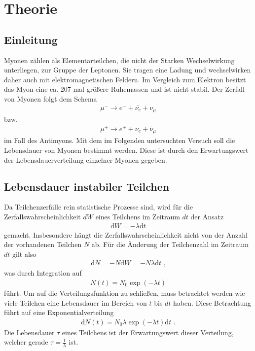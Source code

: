 \section{Theorie}
\label{sec:Theorie}

\subsection{Einleitung}
\label{subsec:Einleitung}
Myonen zählen als Elementarteilchen, die nicht der Starken Wechselwirkung unterliegen, zur Gruppe der Leptonen.
Sie tragen eine Ladung und wechselwirken daher auch mit elektromagnetischen Feldern.
Im Vergleich zum Elektron besitzt das Myon eine ca. 207 mal größere Ruhemassen und ist nicht stabil.
Der Zerfall von Myonen folgt dem Schema
\begin{align}
\mu^- \longrightarrow e^- + \bar{\nu_e} + \nu_\mu
\end{align}
bzw.
\begin{align}
\mu^+ \longrightarrow e^+ + \nu_e + \bar{\nu}_\mu
\end{align}
im Fall des Antimyons.
Mit dem im Folgenden untersuchten Versuch soll die Lebensdauer von Myonen bestimmt werden.
Diese ist durch den Erwartungswert der Lebensdauerverteilung einzelner Myonen gegeben.
\subsection{Lebensdauer instabiler Teilchen}
\label{subsec:Lebensdauer instabiler Teilchen}
Da Teilchenzerfälle rein statistische Prozesse sind, wird für die Zerfallswahrscheinlichkeit $dW$ eines Teilchens im Zeitraum $dt$ der Ansatz
\begin{align}
\text{d} W = -  \lambda \text{d} t
\end{align} 
gemacht.
Insbesondere hängt die Zerfallswahrscheinlichkeit nicht von der Anzahl der vorhandenen Teilchen $N$ ab.
Für die Änderung der Teilchenzahl im Zeitraum $dt$ gilt also
\begin{align}
\text{d} N = - N \text{d} W = - N \lambda \text{d} t\text{ ,}
\end{align} 
was durch Integration auf 
\begin{align}
N(t)=N_0\exp(-\lambda t)
\end{align}
führt.
Um auf die Verteilungsfunktion zu schließen, muss betrachtet werden wie viele Teilchen eine Lebensdauer im Bereich von $t$ bis $dt$ haben.
Diese Betrachtung führt auf eine Exponentialverteilung
\begin{align}
\text{d} N(t)=N_0 \lambda \exp(-\lambda t) \text{d} t \text{ .}
\end{align}
Die Lebensdauer $\tau$ eines Teilchens ist der Erwartungswert dieser Verteilung, welcher gerade $\tau = \frac{1}{\lambda}$ ist.
\cite{sample}
